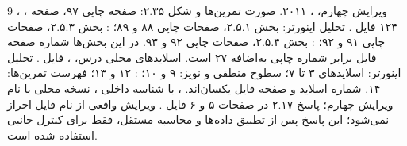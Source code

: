 \documentclass[12pt,a4paper]{article}
\newcommand{\exnum}[1]{\mbox{\beginL#1\endL}}
\begin{document}
\MakeAssignmentCover



\clearpage
\begin{thebibliography}{9}
،
،
ویرایش چهارم، ، ۲۰۱۱.
صورت تمرین‌ها و شکل \exnum{۲.۳۵}: صفحه چاپی ۹۷، صفحه ۱۲۴ فایل .
تحلیل اینورتر: بخش \exnum{۲.۵.۱}، صفحات چاپی ۸۸ و ۸۹؛
: بخش \exnum{۲.۵.۳}، صفحات چاپی ۹۱ و ۹۲؛
: بخش \exnum{۲.۵.۴}، صفحات چاپی ۹۲ و ۹۳.
در این بخش‌ها شماره صفحه فایل برابر شماره چاپی به‌اضافه ۲۷ است.
اسلایدهای محلی درس، ،
فایل .
تحلیل اینورتر: اسلایدهای ۳ تا ۷؛ سطوح منطقی و نویز: ۹ و ۱۰؛
: ۱۲ و ۱۳؛ فهرست تمرین‌ها: ۱۴.
شماره اسلاید و صفحه فایل یکسان‌اند.
، با شناسه داخلی
،
نسخه محلی با نام ویرایش چهارم؛ پاسخ \exnum{۲.۱۷} در صفحات ۵ و ۶ فایل .
ویرایش واقعی از نام فایل احراز نمی‌شود؛ این پاسخ پس از تطبیق داده‌ها و محاسبه مستقل، فقط برای کنترل جانبی استفاده شده است.
\end{thebibliography}
\end{document}
